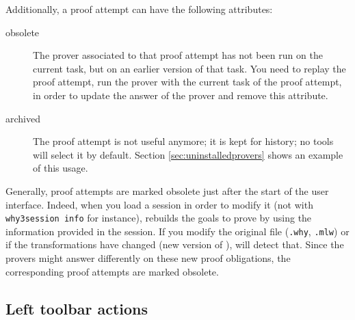 Additionally, a proof attempt can have the following attributes:

\begin{description}
\item[obsolete] The prover associated to
  that proof attempt has not been run on the current task, but on an
  earlier version of that task. You need to replay the proof
  attempt, \ie run the prover with the current task of the proof
  attempt, in order to update the answer of the prover and remove this
  attribute.
\item[archived] The proof attempt is not useful
  anymore; it is kept for history; no \why tools will select it by
  default. Section \ref{sec:uninstalledprovers} shows an example
  of this usage.
\end{description}

Generally, proof attempts are marked obsolete just after
the start of the user interface. Indeed, when you load a session in order to
modify it (not with \texttt{why3session info} for instance), \why
rebuilds the goals to prove by using the information provided in the
session. If you modify the original file (\texttt{.why}, \texttt{.mlw}) or if the
transformations have changed (new version of \why), \why will detect
that. Since the provers might answer differently on these new
proof obligations, the corresponding proof attempts are marked obsolete.



\subsection{Left toolbar actions}


